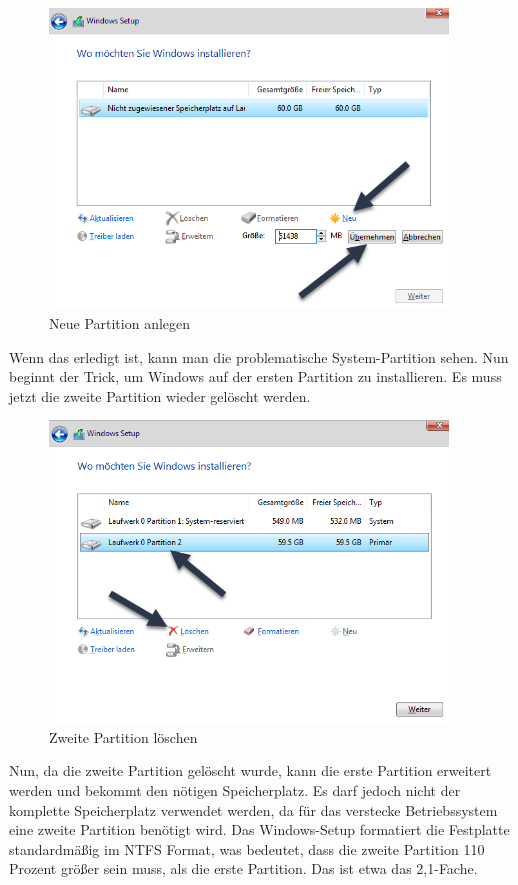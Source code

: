 \documentclass[12pt,a4paper]{scrreprt}
\begin{document}
\begin{figure}[h]
\begin{center}
\includegraphics[width=300pt]{media/hb1.png}
\caption{Neue Partition anlegen}
\label{hb1}
\end{center}
\end{figure}

\newpage

\noindent Wenn das erledigt ist, kann man die problematische System-Partition sehen. Nun beginnt der Trick, um Windows auf der ersten Partition zu installieren. Es muss jetzt die zweite Partition wieder gelöscht werden.

\begin{figure}[h]
\begin{center}
\includegraphics[width=300pt]{media/hb2.png}
\caption{Zweite Partition löschen}
\label{hb2}
\end{center}
\end{figure}

\noindent Nun, da die zweite Partition gelöscht wurde, kann die erste Partition erweitert werden und bekommt den nötigen Speicherplatz. Es darf jedoch nicht der komplette Speicherplatz verwendet werden, da für das verstecke Betriebssystem eine zweite Partition benötigt wird. Das Windows-Setup formatiert die Festplatte standardmäßig im NTFS Format, was bedeutet, dass die zweite Partition 110 Prozent größer sein muss, als die erste Partition. Das ist etwa das 2,1-Fache.
\end{document}
